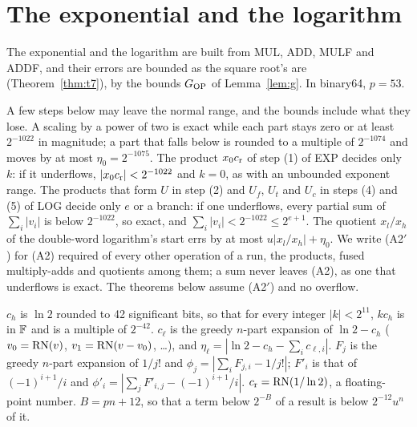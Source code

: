 
\section{The exponential and the logarithm}\label{sec:explog}

The exponential and the logarithm are built from MUL, ADD, MULF and ADDF, and their errors are bounded as the square
root's are (Theorem~\ref{thm:t7}), by the bounds $G_{\rm OP}$ of Lemma~\ref{lem:g}. In binary64, $p = 53$.

 A few steps below may leave the normal range, and the bounds include what they lose. A scaling by
a power of two is exact while each part stays zero or at least $2^{-1022}$ in magnitude; a part that falls below is
rounded to a multiple of $2^{-1074}$ and moves by at most $\eta_0 = 2^{-1075}$. The product $x_0c_{\rm r}$ of step (1) of
EXP decides only $k$: if it underflows, $|x_0c_{\rm r}| < 2^{-1022}$ and $k = 0$, as with an unbounded exponent range. The
products that form $U$ in step (2) and $U_f$, $U_t$ and $U_c$ in steps (4) and (5) of LOG decide only $e$ or a branch:
if one underflows, every partial sum of $\sum_i|v_i|$ is below $2^{-1022}$, so exact, and $\sum_i|v_i| < 2^{-1022} \le
2^{e+1}$. The quotient $x_l/x_h$ of the double-word logarithm's start errs by at most $u|x_l/x_h| + \eta_0$. We write
(A2$'$) for (A2) required of every other operation of a run, the products, fused multiply-adds and quotients among them;
a sum never leaves (A2), as one that underflows is exact. The theorems below assume (A2$'$) and no overflow.

 $c_h$ is $\ln 2$ rounded to 42 significant bits, so that for every integer $|k| < 2^{11}$, $kc_h$
is in $\mathbb{F}$ and is a multiple of $2^{-42}$. $c_\ell$ is the greedy $n$-part expansion of $\ln 2 - c_h$ ($v_0 = \mathrm{RN}(v)$,
$v_1 = \mathrm{RN}(v - v_0)$, \dots), and $\eta_\ell = |\ln 2 - c_h - \sum_i c_{\ell,i}|$. $F_j$ is the greedy $n$-part
expansion of $1/j!$ and $\phi_j = |\sum_iF_{j,i} - 1/j!|$; $F'_i$ is that of $(-1)^{i+1}/i$ and $\phi'_i =
|\sum_jF'_{i,j} - (-1)^{i+1}/i|$. $c_{\rm r} = \mathrm{RN}(1/\ln 2)$, a floating-point number. $B = pn + 12$, so that a term below $2^{-B}$ of a
result is below $2^{-12}u^n$ of it.

